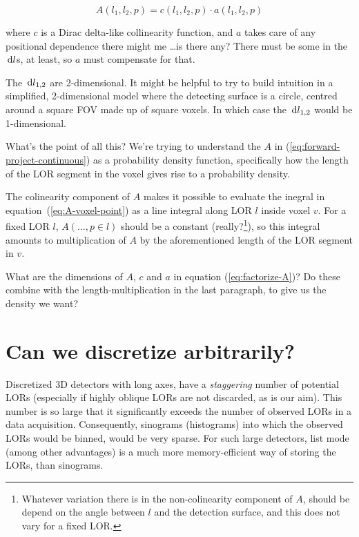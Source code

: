 \documentclass[10pt, a4paper, twocolumn]{article} %
\newcommand\dd[1]  { \,\textrm d{#1} }   %
\begin{document}
\begin{equation}
A(l_{1}, l_{2}, p) = c(l_{1}, l_{2}, p)\cdot a(l_{1}, l_{2}, p)\label{eq:factorize-A}
\end{equation}

where \(c\)
is a Dirac delta-like collinearity function, and \(a\) takes care of any
positional dependence there might me \ldots is there any? There must be some in
the \(\dd l\)s, at least, so \(a\) must compensate for that.

The \(\dd l_{1,2}\) are 2-dimensional. It might be helpful to try to build
intuition in a simplified, 2-dimensional model where the detecting surface is a
circle, centred around a square FOV made up of square voxels. In which case the
\(\dd l_{1,2}\) would be 1-dimensional.

What's the point of all this? We're trying to understand the \(A\) in
(\ref{eq:forward-project-continuous}) as a probability density function,
specifically how the length of the LOR segment in the voxel gives rise to a
probability density.

The colinearity component of \(A\) makes it possible to evaluate the inegral in
equation~(\ref{eq:A-voxel-point}) as a line integral along LOR \(l\) inside
voxel \(v\). For a fixed LOR \(l\), \(A(\ldots, p\in l)\) should be a constant
(really?\footnote{Whatever variation there is in the non-colinearity component
  of \(A\), should be depend on the angle between \(l\) and the detection
  surface, and this does not vary for a fixed LOR.}), so this integral amounts
to multiplication of \(A\) by the aforementioned length of the LOR segment in
\(v\).

What are the dimensions of \(A\), \(c\) and \(a\) in equation
(\ref{eq:factorize-A})? Do these combine with the length-multiplication in the
last paragraph, to give us the density we want?


\section{Can we discretize arbitrarily?}

Discretized 3D detectors with long axes, have a \textit{staggering} number of
potential LORs (especially if highly oblique LORs are not discarded, as is our
aim). This number is so large that it significantly exceeds the number of
observed LORs in a data acquisition. Consequently, sinograms (histograms) into
which the observed LORs would be binned, would be very sparse. For such large
detectors, list mode (among other advantages) is a much more memory-efficient
way of storing the LORs, than sinograms.
\end{document}
